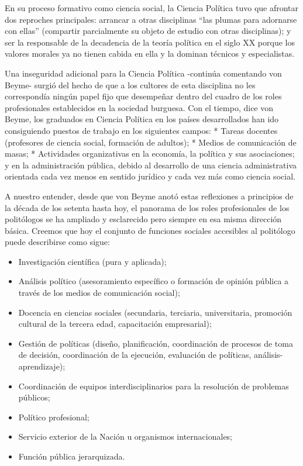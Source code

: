 \documentclass[
]{book}
\providecommand{\tightlist}{%
  \setlength{\itemsep}{0pt}\setlength{\parskip}{0pt}}
\begin{document}
En su proceso formativo como ciencia social, la Ciencia Política tuvo que afrontar dos reproches principales: arrancar a otras disciplinas ``las plumas para adornarse con ellas'' (compartir parcialmente su objeto de estudio con otras disciplinas); y ser la responsable de la decadencia de la teoría política en el siglo XX porque los valores morales ya no tienen cabida en ella y la dominan técnicos y especialistas.

Una inseguridad adicional para la Ciencia Política -continúa comentando von Beyme- surgió del hecho de que a los cultores de esta disciplina no les correspondía ningún papel fijo que desempeñar dentro del cuadro de los roles profesionales establecidos en la sociedad burguesa. Con el tiempo, dice von Beyme, los graduados en Ciencia Política en los países desarrollados han ido consiguiendo puestos de trabajo en los siguientes campos: * Tareas docentes (profesores de ciencia social, formación de adultos); * Medios de comunicación de masas; * Actividades organizativas en la economía, la política y sus asociaciones; y en la administración pública, debido al desarrollo de una ciencia administrativa orientada cada vez menos en sentido jurídico y cada vez más como ciencia social.

A nuestro entender, desde que von Beyme anotó estas reflexiones a principios de la década de los setenta hasta hoy, el panorama de los roles profesionales de los politólogos se ha ampliado y esclarecido pero siempre en esa misma dirección básica. Creemos que hoy el conjunto de funciones sociales accesibles al politólogo puede describirse como sigue:

\begin{itemize}
\tightlist
\item
  Investigación científica (pura y aplicada);
\item
  Análisis político (asesoramiento específico o formación de opinión pública a través de los medios de comunicación social);
\item
  Docencia en ciencias sociales (secundaria, terciaria, universitaria, promoción cultural de la tercera edad, capacitación empresarial);
\item
  Gestión de políticas (diseño, planificación, coordinación de procesos de toma de decisión, coordinación de la ejecución, evaluación de políticas, análisis-aprendizaje);
\item
  Coordinación de equipos interdisciplinarios para la resolución de problemas públicos;
\item
  Político profesional;
\item
  Servicio exterior de la Nación u organismos internacionales;
\item
  Función pública jerarquizada.
\end{itemize}
\end{document}
